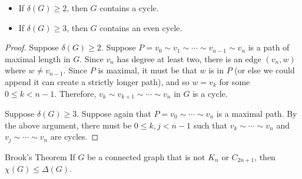 \begin{prop}\proofbreak
    \begin{itemize}
        \item If $\delta(G) \geq 2$, then $G$ contains a cycle.
        \item If $\delta(G) \geq 3$, then $G$ contains an even cycle.
    \end{itemize}
\end{prop}

\begin{proof}
    Suppose $\delta(G) \geq 2$. Suppose $P = v_0 \sim v_1 \sim \cdots \sim v_{n-1} \sim v_n$ is a path of maximal length in $G$. Since $v_n$ has degree at least two, there is an edge $(v_n, w)$ where $w \neq v_{n-1}$. Since $P$ is maximal, it must be that $w$ is in $P$ (or else we could append it can create a strictly longer path), and so $w = v_k$ for some $0 \leq k < n-1$. Therefore, $v_k \sim v_{k+1} \sim \cdots \sim v_n$ in $G$ is a cycle.

    Suppose $\delta(G) \geq 3$. Suppose again that $P = v_0 \sim \cdots \sim v_n$ is a maximal path. By the above argument, there must be $0 \leq k, j < n-1$ such that $v_k \sim \cdots \sim v_n$ and $v_j \sim \cdots \sim v_n$ are cycles.
\end{proof}

\begin{thm}{Brook's Theorem}\label{thm:brooks-coloring}\proofbreak
    If $G$ be a connected graph that is not $K_n$ or $C_{2n+1}$, then $\chi(G) \leq \Delta(G)$.
\end{thm}

